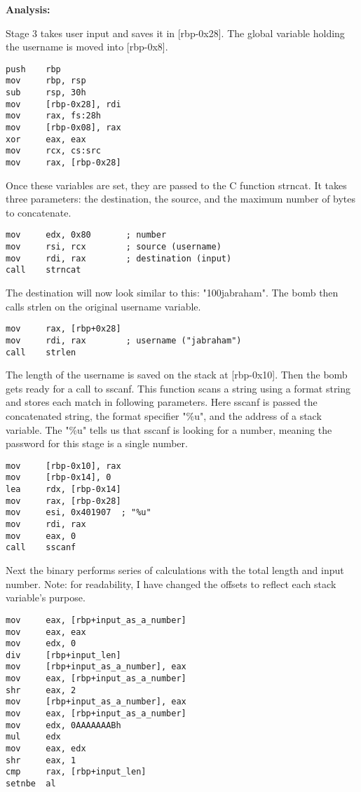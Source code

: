 \documentclass{article}
\begin{document}
\begin{flushleft}
\textbf{Analysis:}
\vspace{.5pc}
\end{flushleft}

\par
Stage 3 takes user input and saves it in [rbp-0x28].  The global variable 
holding the username is moved into [rbp-0x8].
\begin{lstlisting}
push    rbp
mov     rbp, rsp
sub     rsp, 30h
mov     [rbp-0x28], rdi
mov     rax, fs:28h
mov     [rbp-0x08], rax
xor     eax, eax
mov     rcx, cs:src
mov     rax, [rbp-0x28]
\end{lstlisting}
Once these variables are set, they are passed to the C function strncat.  It 
takes three parameters: the destination, the source, and the maximum number of
bytes to concatenate.
\begin{lstlisting}
mov     edx, 0x80       ; number
mov     rsi, rcx        ; source (username)
mov     rdi, rax        ; destination (input)
call    strncat
\end{lstlisting}
\par
The destination will now look similar to this: "100jabraham".  The bomb then 
calls strlen on the original username variable.
\begin{lstlisting}
mov     rax, [rbp+0x28]
mov     rdi, rax        ; username ("jabraham")
call    strlen
\end{lstlisting}
\par
The length of the username is saved on the stack at [rbp-0x10].  Then the bomb
gets ready for a call to sscanf.  This function scans a string using a format
string and stores each match in following parameters.  Here sscanf is passed 
the concatenated string, the format specifier "\%u", and the address of a 
stack variable.  The "\%u" tells us that sscanf is looking for a number, 
meaning the password for this stage is a single number.  
\begin{lstlisting}
mov     [rbp-0x10], rax
mov     [rbp-0x14], 0
lea     rdx, [rbp-0x14]
mov     rax, [rbp-0x28]
mov     esi, 0x401907  ; "%u"
mov     rdi, rax
mov     eax, 0
call    sscanf
\end{lstlisting}
\par
Next the binary performs series of calculations with the total length and 
input number.  Note: for readability, I have changed the offsets to reflect
each stack variable's purpose.
\begin{lstlisting}
mov     eax, [rbp+input_as_a_number]
mov     eax, eax
mov     edx, 0
div     [rbp+input_len]
mov     [rbp+input_as_a_number], eax
mov     eax, [rbp+input_as_a_number]
shr     eax, 2
mov     [rbp+input_as_a_number], eax
mov     eax, [rbp+input_as_a_number]
mov     edx, 0AAAAAAABh
mul     edx
mov     eax, edx
shr     eax, 1
cmp     rax, [rbp+input_len]
setnbe  al
\end{lstlisting}
\end{document}
